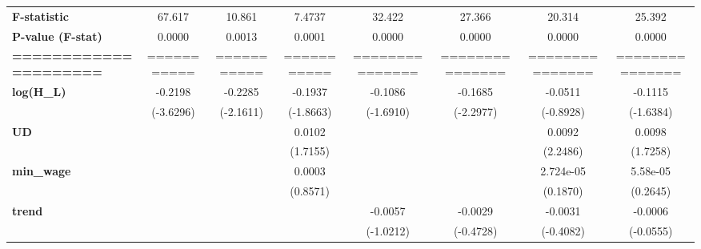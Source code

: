 \documentclass{article}
\begin{document}
\begin{table}[!htbp]
\begin{center}
{\begin{tabular}{lccccccc}
\textbf{F-statistic}             &            67.617            &             10.861             &      7.4737      &       32.422      &        27.366        &       20.314      &       25.392       \\
\textbf{P-value (F-stat)}        &            0.0000            &             0.0013             &      0.0001      &       0.0000      &        0.0000        &       0.0000      &       0.0000       \\
\textbf{=====================}   &         ===========          &          ===========           &   ===========    &  ===============  &   ===============    &  ===============  &  ===============   \\
\textbf{log(H\_L)}               &           -0.2198            &            -0.2285             &     -0.1937      &      -0.1086      &       -0.1685        &      -0.0511      &      -0.1115       \\
\textbf{ }                       &          (-3.6296)           &           (-2.1611)            &    (-1.8663)     &     (-1.6910)     &      (-2.2977)       &     (-0.8928)     &     (-1.6384)      \\
\textbf{UD}                      &                              &                                &      0.0102      &                   &                      &       0.0092      &       0.0098       \\
\textbf{ }                       &                              &                                &     (1.7155)     &                   &                      &      (2.2486)     &      (1.7258)      \\
\textbf{min\_wage}               &                              &                                &      0.0003      &                   &                      &     2.724e-05     &      5.58e-05      \\
\textbf{ }                       &                              &                                &     (0.8571)     &                   &                      &      (0.1870)     &      (0.2645)      \\
\textbf{trend}                   &                              &                                &                  &      -0.0057      &       -0.0029        &      -0.0031      &      -0.0006       \\
\textbf{ }                       &                              &                                &                  &     (-1.0212)     &      (-0.4728)       &     (-0.4082)     &     (-0.0555)      \\

\end{tabular}}
\end{center}
\end{table}
\end{document}
